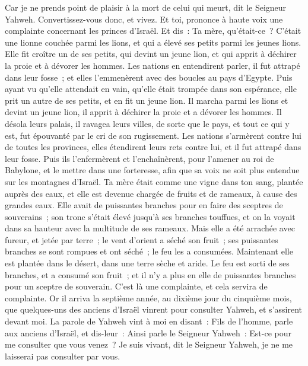 \begin{multicols}{2}
Car je ne prends point de plaisir à la mort de celui qui meurt, dit le Seigneur Yahweh. Convertissez-vous donc, et vivez.
\VerseOne{}Et toi, prononce à haute voix une complainte concernant les princes d'Israël.
Et dis~: Ta mère, qu'était-ce~? C'était une lionne couchée parmi les lions, et qui a élevé ses petits parmi les jeunes lions.
Elle fit croître un de ses petits, qui devint un jeune lion, et qui apprit à déchirer la proie et à dévorer les hommes.
Les nations en entendirent parler, il fut attrapé dans leur fosse~; et elles l'emmenèrent avec des boucles au pays d'Egypte.
Puis ayant vu qu'elle attendait en vain, qu'elle était trompée dans son espérance, elle prit un autre de ses petits, et en fit un jeune lion.
Il marcha parmi les lions et devint un jeune lion, il apprit à déchirer la proie et a dévorer les hommes.
Il désola leurs palais, il ravagea leurs villes, de sorte que le pays, et tout ce qui y est, fut épouvanté par le cri de son rugissement.
Les nations s'armèrent contre lui de toutes les provinces, elles étendirent leurs rets contre lui, et il fut attrapé dans leur fosse.
Puis ils l'enfermèrent et l'enchaînèrent, pour l'amener au roi de Babylone, et le mettre dans une forteresse, afin que sa voix ne soit plus entendue sur les montagnes d'Israël.
Ta mère était comme une vigne dans ton sang, plantée auprès des eaux, et elle est devenue chargée de fruits et de rameaux, à cause des grandes eaux.
Elle avait de puissantes branches pour en faire des sceptres de souverains~; son tronc s'était élevé jusqu'à ses branches touffues, et on la voyait dans sa hauteur avec la multitude de ses rameaux.
Mais elle a été arrachée avec fureur, et jetée par terre~; le vent d'orient a séché son fruit~; ses puissantes branches se sont rompues et ont séché~; le feu les a consumées.
Maintenant elle est plantée dans le désert, dans une terre sèche et aride.
Le feu est sorti de ses branches, et a consumé son fruit~; et il n'y a plus en elle de puissantes branches pour un sceptre de souverain. C'est là une complainte, et cela servira de complainte.
\VerseOne{}Or il arriva la septième année, au dixième jour du cinquième mois, que quelques-uns des anciens d'Israël vinrent pour consulter Yahweh, et s'assirent devant moi.
La parole de Yahweh vint à moi en disant~:
Fils de l'homme, parle aux anciens d'Israël, et dis-leur~: Ainsi parle le Seigneur Yahweh~: Est-ce pour me consulter que vous venez~? Je suis vivant, dit le Seigneur Yahweh, je ne me laisserai pas consulter par vous.

\end{multicols}
